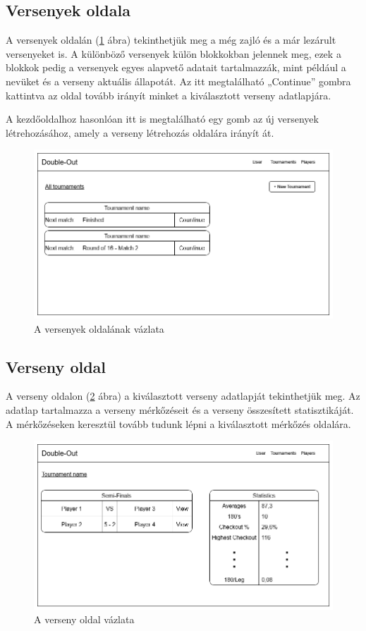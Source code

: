 \subsection{Versenyek oldala}
A versenyek oldalán (\ref{fig:tournaments} ábra) tekinthetjük meg a még zajló és a már lezárult versenyeket is. A különböző versenyek külön blokkokban jelennek meg, ezek a blokkok pedig a versenyek egyes alapvető adatait tartalmazzák, mint például a nevüket és a verseny aktuális állapotát. Az itt megtalálható „Continue” gombra kattintva az oldal tovább irányít minket a kiválasztott verseny adatlapjára.

A kezdőoldalhoz hasonlóan itt is megtalálható egy gomb az új versenyek létrehozásához, amely a verseny létrehozás oldalára irányít át. 

\begin{figure}[h]
\centering
\includegraphics[scale=0.5]{images/Tournaments.png}
\caption{A versenyek oldalának vázlata}
\label{fig:tournaments}
\end{figure}

\subsection{Verseny oldal}
A verseny oldalon (\ref{fig:tournament} ábra) a kiválasztott verseny adatlapját tekinthetjük meg. Az adatlap tartalmazza a verseny mérkőzéseit és a verseny összesített statisztikáját. A mérkőzéseken keresztül tovább tudunk lépni a kiválasztott mérkőzés oldalára.

\begin{figure}[h]
\centering
\includegraphics[scale=0.5]{images/TournamentPage.png}
\caption{A verseny oldal vázlata}
\label{fig:tournament}
\end{figure}

